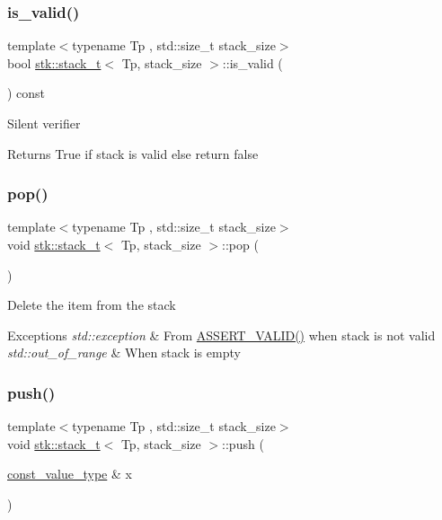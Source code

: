 \subsubsection{\texorpdfstring{is\+\_\+valid()}{is\_valid()}}
{\footnotesize\ttfamily template$<$typename Tp , std\+::size\+\_\+t stack\+\_\+size$>$ \\
bool \hyperlink{classstk_1_1stack__t}{stk\+::stack\+\_\+t}$<$ Tp, stack\+\_\+size $>$\+::is\+\_\+valid (\begin{DoxyParamCaption}{ }\end{DoxyParamCaption}) const\hspace{0.3cm}{\ttfamily [private]}}

Silent verifier \begin{DoxyReturn}{Returns}
True if stack is valid else return false 
\end{DoxyReturn}
\mbox{\label{classstk_1_1stack__t_a5be99b150a46b8456643cbc40bcefca8}} 
\subsubsection{\texorpdfstring{pop()}{pop()}}
{\footnotesize\ttfamily template$<$typename Tp , std\+::size\+\_\+t stack\+\_\+size$>$ \\
void \hyperlink{classstk_1_1stack__t}{stk\+::stack\+\_\+t}$<$ Tp, stack\+\_\+size $>$\+::pop (\begin{DoxyParamCaption}{ }\end{DoxyParamCaption})}

Delete the item from the stack 
\begin{DoxyExceptions}{Exceptions}
{\em std\+::exception} & From \hyperlink{stack_8h_a4ad7af85cae2910ffcf6bfbcb8278886}{A\+S\+S\+E\+R\+T\+\_\+\+V\+A\+L\+I\+D()} when stack is not valid \\
\hline
{\em std\+::out\+\_\+of\+\_\+range} & When stack is empty \\
\hline
\end{DoxyExceptions}
\mbox{\label{classstk_1_1stack__t_aad7638faa441f17e91ba9a8f5663be4c}} 
\subsubsection{\texorpdfstring{push()}{push()}}
{\footnotesize\ttfamily template$<$typename Tp , std\+::size\+\_\+t stack\+\_\+size$>$ \\
void \hyperlink{classstk_1_1stack__t}{stk\+::stack\+\_\+t}$<$ Tp, stack\+\_\+size $>$\+::push (\begin{DoxyParamCaption}\item[{\hyperlink{classstk_1_1stack__t_a27d586bc06e0faf30a2a980cd8ffd125}{const\+\_\+value\+\_\+type} \&}]{x }\end{DoxyParamCaption})}

